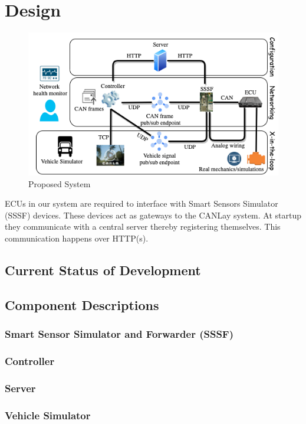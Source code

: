 \documentclass[letterpaper,twocolumn,12pt]{article}
\begin{document}
\section{Design}
\begin{figure}[t!]
    \centering
    \includegraphics[width=\linewidth]{images/system_design.drawio.png}
    \caption{Proposed System}
    \label{fig:goal}
\end{figure}
ECUs in our system are required to interface with Smart Sensors Simulator (SSSF) devices. These devices act as gateways to the CANLay system. At startup they communicate with a central server thereby registering themselves. This communication happens over HTTP(s). 

\subsection{Current Status of Development}

\subsection{Component Descriptions}
\subsubsection{Smart Sensor Simulator and Forwarder (SSSF)}
\subsubsection{Controller}
\subsubsection{Server}
\subsubsection{Vehicle Simulator}
\end{document}
